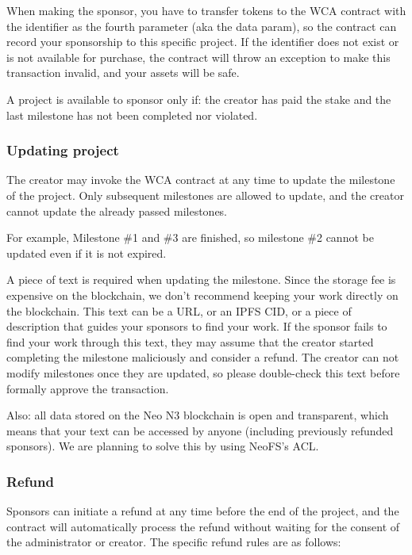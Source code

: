 When making the sponsor, you have to transfer tokens to the WCA contract with
the identifier as the fourth parameter (aka the data param), so the contract
can record your sponsorship to this specific project.
If the identifier does not exist or is not available for purchase, the contract
will throw an exception to make this transaction invalid, and your assets will be safe.

A project is available to sponsor only if: the creator has paid the stake
and the last milestone has not been completed nor violated.

\subsubsection{Updating project}

The creator may invoke the WCA contract at any time to update the milestone
of the project.
Only subsequent milestones are allowed to update, and the creator cannot
update the already passed milestones.

For example, Milestone \#1 and \#3 are finished, so milestone \#2 cannot be
updated even if it is not expired.

A piece of text is required when updating the milestone.
Since the storage fee is expensive on the blockchain, we don't recommend keeping
your work directly on the blockchain.
This text can be a URL, or an IPFS CID, or a piece of description that guides
your sponsors to find your work.
If the sponsor fails to find your work through this text, they may assume that
the creator started completing the milestone maliciously and consider a refund.
The creator can not modify milestones once they are updated, so please
double-check this text before formally approve the transaction.

Also: all data stored on the Neo N3 blockchain is open and transparent, which
means that your text can be accessed by anyone (including previously refunded
sponsors).
We are planning to solve this by using NeoFS's ACL\@.

\subsubsection{Refund}

Sponsors can initiate a refund at any time before the end of the project,
and the contract will automatically process the refund without waiting for
the consent of the administrator or creator.
The specific refund rules are as follows:

